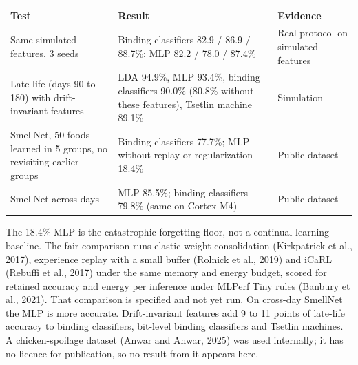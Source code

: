 \documentclass[10pt,letterpaper]{article}
\newcounter{none}
\begin{document}
{\def\LTcaptype{none} %
{\footnotesize\setlength{\tabcolsep}{3.8pt}\renewcommand{\arraystretch}{1.15}
\begin{longtable}[]{@{}
  >{\raggedright\arraybackslash}p{}
  >{\raggedright\arraybackslash}p{}
  >{\raggedright\arraybackslash}p{}@{}}
\toprule\noalign{}
\begin{minipage}[b]{\linewidth}\raggedright
\textbf{Test}
\end{minipage} & \begin{minipage}[b]{\linewidth}\raggedright
\textbf{Result}
\end{minipage} & \begin{minipage}[b]{\linewidth}\raggedright
\textbf{Evidence}
\end{minipage} \\
\midrule\noalign{}
\endhead
\bottomrule\noalign{}
\endlastfoot
Same simulated features, 3 seeds & Binding classifiers 82.9 / 86.9 /
88.7\%; MLP 82.2 / 78.0 / 87.4\% & Real protocol on simulated
features \\
Late life (days 90 to 180) with drift-invariant features & LDA 94.9\%,
MLP 93.4\%, binding classifiers 90.0\% (80.8\% without these features),
Tsetlin machine 89.1\% & Simulation \\
SmellNet, 50 foods learned in 5 groups, no revisiting earlier groups &
Binding classifiers 77.7\%; MLP without replay or regularization 18.4\%
& Public dataset \\
SmellNet across days & MLP 85.5\%; binding classifiers 79.8\% (same on
Cortex-M4) & Public dataset \\
\end{longtable}
}
}

The 18.4\% MLP is the catastrophic-forgetting floor, not a
continual-learning baseline. The fair comparison runs elastic weight
consolidation (Kirkpatrick et al., 2017), experience replay with a small
buffer (Rolnick et al., 2019) and iCaRL (Rebuffi et al., 2017) under the
same memory and energy budget, scored for retained accuracy and energy
per inference under MLPerf Tiny rules (Banbury et al., 2021). That
comparison is specified and not yet run. On cross-day SmellNet the MLP
is more accurate. Drift-invariant features add 9 to 11 points of
late-life accuracy to binding classifiers, bit-level binding classifiers
and Tsetlin machines. A chicken-spoilage dataset (Anwar and Anwar, 2025)
was used internally; it has no licence for publication, so no result
from it appears here.
\end{document}
